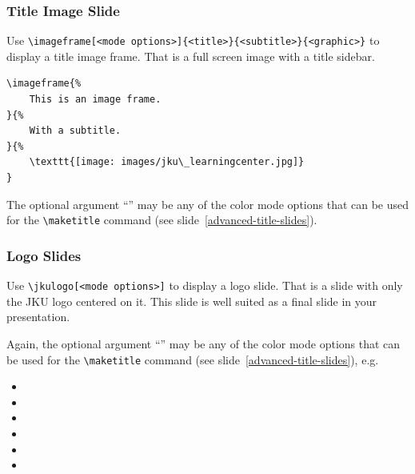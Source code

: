 \documentclass[utf8,aspectratio=169,ngerman,english]{beamer}
\begin{document}
\begin{frame}
\frametitle{Title Image Slide}

Use \verb|\imageframe[<mode options>]{<title>}{<subtitle>}{<graphic>}| to display a title image frame. That is a full screen image with a title sidebar.

\begin{lstlisting}[language={[LaTeX]TeX},numbers=none]
\imageframe{%
    This is an image frame.
}{%
    With a subtitle.
}{%
    \texttt{[image: images/jku\_learningcenter.jpg]}
}
\end{lstlisting}

The optional argument ``'' may be any of the color mode options that can be used for the \verb|\maketitle| command (see slide~\ref{advanced-title-slides}).
\end{frame}




\begin{frame}[containsverbatim]
\frametitle{Logo Slides}

Use \verb|\jkulogo[<mode options>]| to display a logo slide. That is a slide with only the JKU logo centered on it. This slide is well suited as a final slide in your presentation.

Again, the optional argument ``'' may be any of the color mode options that can be used for the \verb|\maketitle| command (see slide~\ref{advanced-title-slides}), e.g.
\begin{itemize}
\item \textverb{\string\jkulogo}
\item \textverb{\string\jkulogo[light]}
\item \textverb{\string\jkulogo[dark]}
\item {}
\item \textverb{\string\jkulogo[gray]}
\item \textverb{\string\jkulogo[black]}
\end{itemize}
\end{frame}
\end{document}
